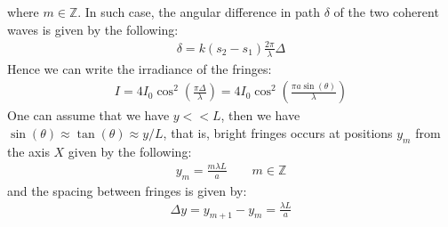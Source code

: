 \documentclass[11pt]{book}
\theoremstyle{break}
\theoremstyle{break}
\newcommand{\Z}{\mathbb{Z}}
\begin{document}
where $m \in \Z$. In such case, the angular difference in path $\delta$ of the two coherent waves is given by the following:
\begin{align*}
\delta = k(s_2 - s_1) \frac{2\pi }{\lambda}\Delta
\end{align*}
Hence we can write the irradiance of the fringes:
\begin{align*}
I = 4I_0 \cos^2\left( \frac{\pi \Delta}{\lambda}\right) = 4I_0 \cos^2\left(\frac{\pi a \sin(\theta)}{\lambda}\right)
\end{align*}
One can assume that we have $y<<L$, then we have $\sin(\theta) \approx \tan(\theta) \approx y/L$, that is, bright fringes occurs at positions $y_m$ from the axis $X$ given by the following:
\begin{align*}
y_m  = \frac{m\lambda L}{a} \qquad m\in \Z
\end{align*}
and the spacing between fringes is given by:
\begin{align*}
\Delta y = y_{m+1}-y_m = \frac{\lambda L}{a}
\end{align*}


\newpage
\end{document}
